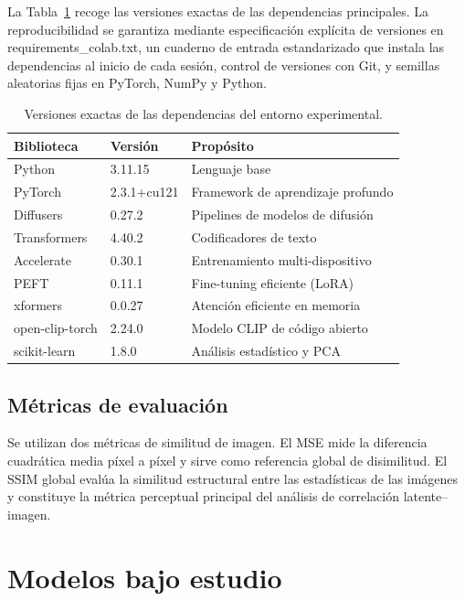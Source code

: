 \documentclass[12pt, a4paper, twoside]{book}
\begin{document}
La Tabla~\ref{tab:software} recoge las versiones exactas de las dependencias principales. La reproducibilidad se garantiza mediante especificación explícita de versiones en requirements\_colab.txt, un cuaderno de entrada estandarizado que instala las dependencias al inicio de cada sesión, control de versiones con Git, y semillas aleatorias fijas en PyTorch, NumPy y Python.

\begin{table}[htb]
\centering
\caption{Versiones exactas de las dependencias del entorno experimental.}
\label{tab:software}
\small
\begin{tabular}{lll}
\toprule
\textbf{Biblioteca} & \textbf{Versión} & \textbf{Propósito} \\
\midrule
Python       & 3.11.15       & Lenguaje base \\
PyTorch      & 2.3.1+cu121   & Framework de aprendizaje profundo \\
Diffusers    & 0.27.2        & Pipelines de modelos de difusión \\
Transformers & 4.40.2        & Codificadores de texto \\
Accelerate   & 0.30.1        & Entrenamiento multi-dispositivo \\
PEFT         & 0.11.1        & Fine-tuning eficiente (LoRA) \\
xformers     & 0.0.27        & Atención eficiente en memoria \\
open-clip-torch & 2.24.0    & Modelo CLIP de código abierto \\
scikit-learn & 1.8.0         & Análisis estadístico y PCA \\
\bottomrule
\end{tabular}
\end{table}

\subsection{Métricas de evaluación}

Se utilizan dos métricas de similitud de imagen. El MSE mide la diferencia cuadrática media píxel a píxel y sirve como referencia global de disimilitud. El SSIM global \citep{wang2004ssim} evalúa la similitud estructural entre las estadísticas de las imágenes y constituye la métrica perceptual principal del análisis de correlación latente--imagen.

\section{Modelos bajo estudio}
\label{sec:modelos}
\end{document}
